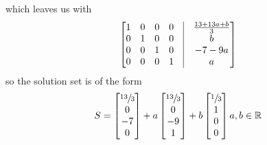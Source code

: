 \documentclass[a4paper,10pt]{article}
\begin{document}
which leaves us with 
\[\begin{bmatrix}
  1 & 0 & 0 & 0  &  \vline  & \frac{13+13a +b}{3}  \\
  0 & 1 & 0 & 0  &   \vline  & b\\
  0 & 0 & 1 & 0 &    \vline  & -7-9a  \\
  0 &  0 & 0 & 1  &   \vline  & a
\end{bmatrix}
\]
so the solution set is of the form 
\[
S=
\begin{bmatrix}
 \sfrac{13}{3} \\ 0\\-7\\ 0\\
\end{bmatrix}
+a\begin{bmatrix}
  \sfrac{13}{3} \\0\\-9\\1
 \end{bmatrix}
+b\begin{bmatrix}
   \sfrac{1}{3} \\ 1\\0\\0
  \end{bmatrix}  
  a,b \in \mathbb{R}
\]
\end{document}
